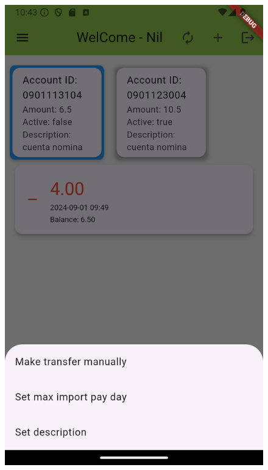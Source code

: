 \documentclass[a4paper,12pt,twoside]{ThesisStyle}
\begin{document}
\begin{figure}[h]
\begin{minipage}{0.30\textwidth}
        \includegraphics[width=\textwidth]{imatges/otherOperation.png}
    \end{minipage}

    \vspace{1em}


\end{figure}
\end{document}

